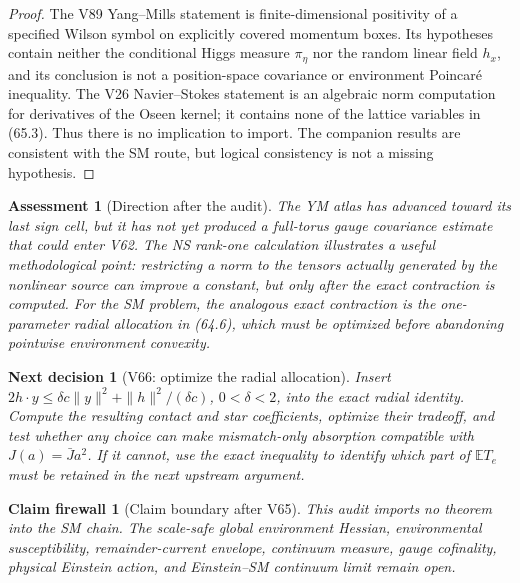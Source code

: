 \documentclass[11pt]{article}
\newtheorem{firewall}[theorem]{Claim firewall}
\newtheorem{decision}[theorem]{Next decision}
\newtheorem{assessment}[theorem]{Assessment}
\theoremstyle{remark}
\begin{document}
\begin{proof}
The V89 Yang--Mills statement is finite-dimensional positivity of a
specified Wilson symbol on explicitly covered momentum boxes.  Its
hypotheses contain neither the conditional Higgs measure \(\pi_\eta\)
nor the random linear field \(h_x\), and its conclusion is not a
position-space covariance or environment Poincar\'e inequality.  The V26
Navier--Stokes statement is an algebraic norm computation for derivatives
of the Oseen kernel; it contains none of the lattice variables in (65.3).
Thus there is no implication to import.  The companion results are
consistent with the SM route, but logical consistency is not a missing
hypothesis.
\end{proof}

\begin{assessment}[Direction after the audit]
\label{ass:v17v65-direction}
The YM atlas has advanced toward its last sign cell, but it has not yet
produced a full-torus gauge covariance estimate that could enter V62.
The NS rank-one calculation illustrates a useful methodological point:
restricting a norm to the tensors actually generated by the nonlinear
source can improve a constant, but only after the exact contraction is
computed.  For the SM problem, the analogous exact contraction is the
one-parameter radial allocation in (64.6), which must be optimized before
abandoning pointwise environment convexity.
\end{assessment}

\begin{decision}[V66: optimize the radial allocation]
\label{dec:v17v65-next}
Insert \(2h\cdot y\leq\delta c\|y\|^2+
\|h\|^2/(\delta c)\), \(0<\delta<2\), into the exact radial identity.
Compute the resulting contact and star coefficients, optimize their
tradeoff, and test whether any choice can make mismatch-only absorption
compatible with \(J(a)=\bar J a^2\).  If it cannot, use the exact
inequality to identify which part of \(\mathbb ET_e\) must be retained
in the next upstream argument.
\end{decision}

\begin{firewall}[Claim boundary after V65]
\label{fire:v17v65}
This audit imports no theorem into the SM chain.  The scale-safe global
environment Hessian, environmental susceptibility, remainder-current
envelope, continuum measure, gauge cofinality, physical Einstein action,
and Einstein--SM continuum limit remain open.
\end{firewall}
\end{document}
